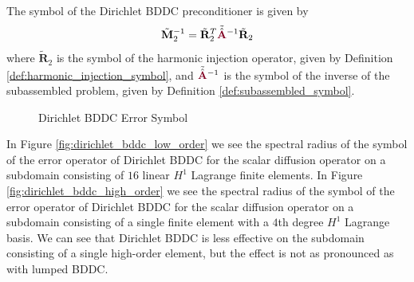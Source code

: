 \begin{definition}
The symbol of the Dirichlet BDDC preconditioner is given by
\begin{equation}
\tilde{\mathbf{M}}^{-1}_2 = \tilde{\mathbf{R}}^T_2 \tilde{\hat{{\color{burgundy}\mathbf{A}}}}^{-1} \tilde{\mathbf{R}}_2
\end{equation}
where $\tilde{\mathbf{R}}_2$ is the symbol of the harmonic injection operator, given by Definition \ref{def:harmonic_injection_symbol}, and $\tilde{\hat{{\color{burgundy}\mathbf{A}}}}^{-1}$ is the symbol of the inverse of the subassembled problem, given by Definition \ref{def:subassembled_symbol}. 
\label{def:dirichlet_bddc_symbol}
\end{definition}

\begin{figure}[!ht]
  \centering
  \hfill
  \caption{Dirichlet BDDC Error Symbol}
\end{figure}

In Figure \ref{fig:dirichlet_bddc_low_order} we see the spectral radius of the symbol of the error operator of Dirichlet BDDC for the scalar diffusion operator on a subdomain consisting of $16$ linear $H^1$ Lagrange finite elements.
In Figure \ref{fig:dirichlet_bddc_high_order} we see the spectral radius of the symbol of the error operator of Dirichlet BDDC for the scalar diffusion operator on a subdomain consisting of a single finite element with a $4$th degree $H^1$ Lagrange basis.
We can see that Dirichlet BDDC is less effective on the subdomain consisting of a single high-order element, but the effect is not as pronounced as with lumped BDDC.
